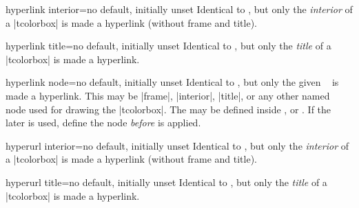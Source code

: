 \clearpage
\begin{docTcbKey}[][doc new=2017-02-03]{hyperlink interior}{=}{no default, initially unset}
  Identical to , but only the \textit{interior} of a
  |tcolorbox| is made a hyperlink (without frame and title).
\end{docTcbKey}

\begin{docTcbKey}[][doc new=2017-02-03]{hyperlink title}{=}{no default, initially unset}
  Identical to , but only the \textit{title} of a
  |tcolorbox| is made a hyperlink.
\end{docTcbKey}

\begin{docTcbKey}[][doc new=2017-02-03]{hyperlink node}{=}{no default, initially unset}
  Identical to , but only the given \tikzname\ 
  is made a hyperlink. This  may be |frame|, |interior|, |title|, or
  any other named node used for drawing the |tcolorbox|.
  The  may be defined inside
  ,  or .
  If the later is used, define the node \emph{before} 
  is applied.
\end{docTcbKey}


\begin{docTcbKey}[][doc new=2017-02-03]{hyperurl interior}{=}{no default, initially unset}
  Identical to , but only the \textit{interior} of a
  |tcolorbox| is made a hyperlink (without frame and title).
\end{docTcbKey}

\begin{docTcbKey}[][doc new=2017-02-03]{hyperurl title}{=}{no default, initially unset}
  Identical to , but only the \textit{title} of a
  |tcolorbox| is made a hyperlink.
\end{docTcbKey}

